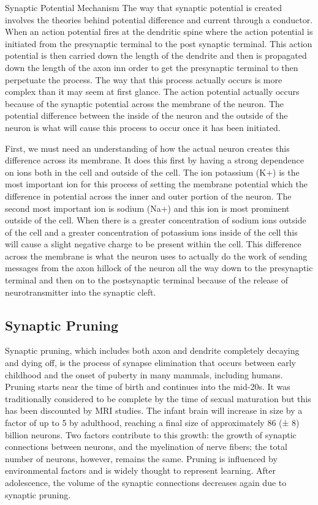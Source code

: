 \documentclass[]{book}
\begin{document}
Synaptic Potential Mechanism
The way that synaptic potential is created involves the theories behind potential difference and current through a conductor. When an action potential fires at the dendritic spine where the action potential is initiated from the presynaptic terminal to the post synaptic terminal. This action potential is then carried down the length of the dendrite and then is propagated down the length of the axon inn order to get the presynaptic terminal to then perpetuate the process. The way that this process actually occurs is more complex than it may seem at first glance. The action potential actually occurs because of the synaptic potential across the membrane of the neuron. The potential difference between the inside of the neuron and the outside of the neuron is what will cause this process to occur once it has been initiated.

First, we must need an understanding of how the actual neuron creates this difference across its membrane. It does this first by having a strong dependence on ions both in the cell and outside of the cell. The ion potassium (K+) is the most important ion for this process of setting the membrane potential which the difference in potential across the inner and outer portion of the neuron. The second most important ion is sodium (Na+) and this ion is most prominent outside of the cell. When there is a greater concentration of sodium ions outside of the cell and a greater concentration of potassium ions inside of the cell this will cause a slight negative charge to be present within the cell. This difference across the membrane is what the neuron uses to actually do the work of sending messages from the axon hillock of the neuron all the way down to the presynaptic terminal and then on to the postsynaptic terminal because of the release of neurotransmitter into the synaptic cleft.

\hypertarget{synaptic-pruning}{%
\subsection{Synaptic Pruning}\label{synaptic-pruning}}

Synaptic pruning, which includes both axon and dendrite completely decaying and dying off, is the process of synapse elimination that occurs between early childhood and the onset of puberty in many mammals, including humans. Pruning starts near the time of birth and continues into the mid-20s. It was traditionally considered to be complete by the time of sexual maturation but this has been discounted by MRI studies. The infant brain will increase in size by a factor of up to 5 by adulthood, reaching a final size of approximately 86 (± 8) billion neurons. Two factors contribute to this growth: the growth of synaptic connections between neurons, and the myelination of nerve fibers; the total number of neurons, however, remains the same. Pruning is influenced by environmental factors and is widely thought to represent learning. After adolescence, the volume of the synaptic connections decreases again due to synaptic pruning.
\end{document}

